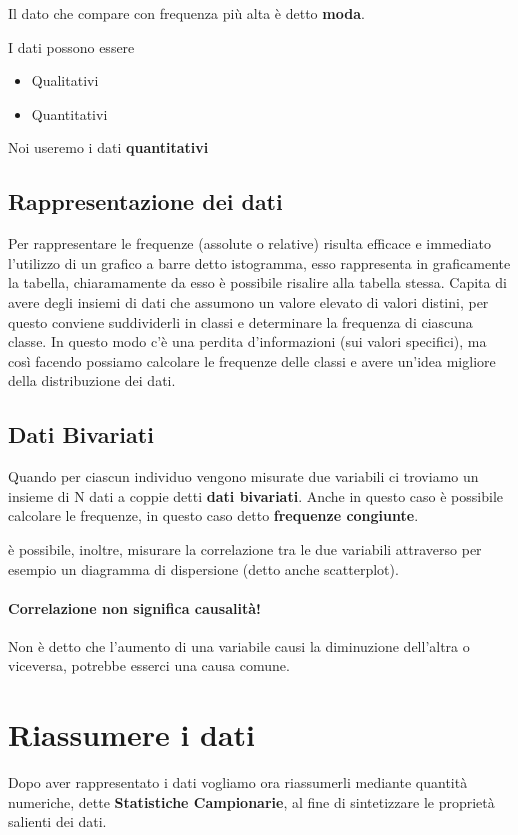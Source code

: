 \documentclass[12pt, a4paper, openany]{book}
\begin{document}
Il dato che compare con frequenza più alta è detto \textbf{moda}.

I dati possono essere
\begin{itemize}
    \item Qualitativi
    \item Quantitativi 
\end{itemize}
Noi useremo i dati \textbf{quantitativi}

\subsection{Rappresentazione dei dati}
Per rappresentare le frequenze (assolute o relative) risulta efficace e immediato l'utilizzo di un grafico a barre detto istogramma,
esso rappresenta in graficamente la tabella, chiaramamente da esso è possibile risalire alla tabella stessa.
Capita di avere degli insiemi di dati che assumono un valore elevato di valori distini, per questo conviene suddividerli in classi e
determinare la frequenza di ciascuna classe. In questo modo c'è una perdita d'informazioni (sui valori specifici), ma così facendo possiamo
calcolare le frequenze delle classi e avere un'idea migliore della distribuzione dei dati.

\subsection{Dati Bivariati}
Quando per ciascun individuo vengono misurate due variabili ci troviamo un insieme di N dati a coppie detti \textbf{dati bivariati}.
Anche in questo caso è possibile calcolare le frequenze, in questo caso detto \textbf{frequenze congiunte}.

è possibile, inoltre, misurare la correlazione tra le due variabili attraverso per esempio un diagramma di dispersione (detto anche scatterplot).

\paragraph{Correlazione non significa causalità!} Non è detto che l'aumento di una variabile causi la diminuzione dell'altra o viceversa, potrebbe esserci una causa comune. 

\section{Riassumere i dati}
Dopo aver rappresentato i dati vogliamo ora riassumerli mediante quantità numeriche, dette \textbf{Statistiche Campionarie}, al fine di sintetizzare le proprietà
salienti dei dati.
\end{document}
